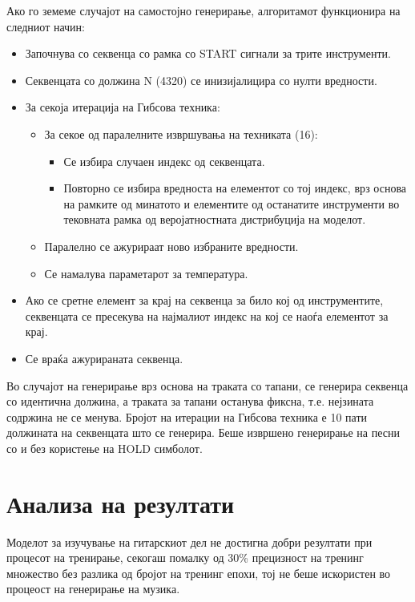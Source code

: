 Ако го земеме случајот на самостојно генерирање, алгоритамот функционира на следниот начин:
\begin{itemize}
    \item Започнува со секвенца со рамка со START сигнали за трите инструменти.
    \item Секвенцата со должина N (4320) се инизијалицира со нулти вредности.
    \item За секоја итерација на Гибсова техника: \begin{itemize}
        \item За секое од паралелните извршувања на техниката (16): \begin{itemize}
            \item Се избира случаен индекс од секвенцата.
            \item Повторно се избира вредноста на елементот со тој индекс, врз основа на рамките од минатото и елементите од останатите инструменти во тековната рамка од веројатностната дистрибуција на моделот.
        \end{itemize}
    \item Паралелно се ажурираат ново избраните вредности.
    \item Се намалува параметарот за температура.
    \end{itemize}
    \item Ако се сретне елемент за крај на секвенца за било кој од инструментите, секвенцата се пресекува на најмалиот индекс на кој се наоѓа елементот за крај.
    \item Се враќа ажурираната секвенца.
\end{itemize}

Во случајот на генерирање врз основа на траката со тапани, се генерира секвенца со идентична должина, а траката за тапани останува фиксна, т.е. нејзината содржина не се менува. Бројот на итерации на Гибсова техника е 10 пати должината на секвенцата што се генерира. Беше извршено генерирање на песни со и без користење на HOLD симболот.

\section{Анализа на резултати}

Моделот за изучување на гитарскиот дел не достигна добри резултати при процесот на тренирање, секогаш помалку од 30\% прецизност на тренинг множество без разлика од бројот на тренинг епохи, тој не беше искористен во процеост на генерирање на музика. 

